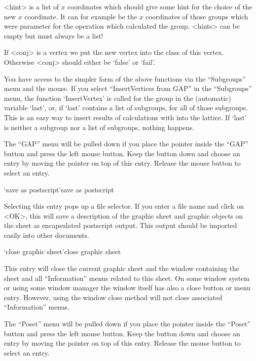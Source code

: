 <hint> is a list of $x$ coordinates which should give some hint for
the choice of the new $x$ coordinate. It can for example be the $x$
coordinates of those groups which were parameter for the operation
which calculated the group. <hints> can be empty but must always be a
list!

If <conj> is a vertex we put the new vertex into the class of this
vertex.  Otherwise <conj> should either be `false' or `fail'.

You have access to the simpler form of the above functions via the
``Subgroups'' menu and the mouse. If you select ``InsertVertices from
GAP'' in the ``Subgroups'' menu, the function `InsertVertex' is called 
for the group in the (automatic) variable `last', or, if `last'
contains a list of subgroups, for all of those subgroups. This is an
easy way to insert results of calculations with {\GAP} into the
lattice. If `last' is neither a subgroup nor a list of subgroups,
nothing happens.



The ``GAP'' menu will  be pulled down if  you place the pointer inside  the
``GAP'' button  and press the left mouse  button.  Keep the button down and
choose an entry by moving the pointer on  top of this entry.  Release the
mouse button to select an entry.

\>`save as postscript'{save as postscript}

Selecting this entry pops up a file  selector.  If you  enter a file name
and click on <OK>, this will save a  description of the graphic sheet and
graphic objects on  the sheet as encapsulated postscript  output. This
output should be imported easily into other documents.

\>`close graphic sheet'{close graphic sheet}

This entry will close the current graphic sheet and the window containing
the sheet  and all  ``Information'' menus related  to  this sheet.  On some
window system or using  some window manager the window  itself has also a
close button or menu entry.  However,  using the window close method will
not close associated ``Information'' menus.



The ``Poset'' menu will be pulled down if you place the pointer inside the
``Poset'' button and  press the left mouse  button.  Keep  the button down
and choose an entry by moving the pointer on top of  this entry.  Release
the mouse button to select an entry.

